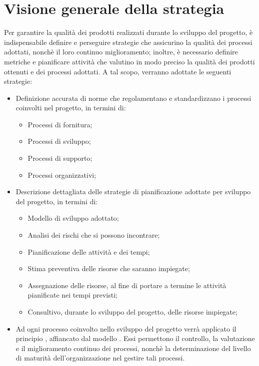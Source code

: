 \documentclass[../PianoDiQualifica.tex]{subfiles}
\begin{document}
	\section{Visione generale della strategia}
	Per garantire la qualità dei prodotti realizzati durante lo sviluppo del progetto, è indispensabile definire e perseguire strategie che assicurino la qualità dei processi adottati, nonchè il loro continuo miglioramento; inoltre, è necessario definire metriche e pianificare attività che valutino in modo preciso la qualità dei prodotti ottenuti e dei processi adottati. A tal scopo, verranno adottate le seguenti strategie:
	\begin{itemize}
	\item Definizione accurata di norme che regolamentano e standardizzano i processi coinvolti nel progetto, in termini di:
		\begin{itemize}
		\item Processi di fornitura;
		\item Processi di sviluppo;
		\item Processi di supporto;
		\item Processi organizzativi;
		\end{itemize}
	\item Descrizione dettagliata delle strategie di pianificazione adottate per sviluppo del progetto, in termini di:
		\begin{itemize}
		\item Modello di sviluppo adottato;
		\item Analisi dei rischi che si possono incontrare;
		\item Pianificazione delle attività e dei tempi;
		\item Stima preventiva delle risorse che saranno impiegate;
		\item Assegnazione delle risorse, al fine di portare a termine le attività pianificate nei tempi previsti;
		\item Consultivo, durante lo sviluppo del progetto, delle risorse impiegate;
		\end{itemize}
	\item Ad ogni processo coinvolto nello sviluppo del progetto verrà applicato il principio , affiancato dal modello . Essi permettono il controllo, la valutazione e il miglioramento continuo dei processi, nonchè la determinazione del livello di maturità dell'organizzazione nel gestire tali processi.
	\end{itemize}
	
\end{document}
